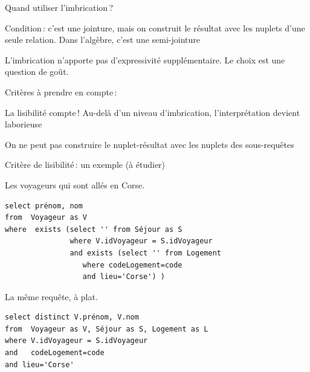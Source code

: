 \begin{frame}[fragile]{Quand utiliser l'imbrication\,?}

\alert{Condition}\,: c'est une jointure, mais on construit le résultat avec les nuplets d'une seule
relation. Dans l'algèbre, c'est une \alert{semi-jointure}

\vfill

L'imbrication n'apporte pas d'expressivité supplémentaire. Le choix est une question de goût.

\vfill

Critères à prendre en compte\,:

\vfill

\begin{redbullet}
  \item La lisibilité compte\,! Au-delà d'un niveau d'imbrication,
      l'interprétation devient laborieuse
  \item On ne peut pas construire le nuplet-résultat avec les nuplets des sous-requêtes
  
\end{redbullet}

\end{frame}


\begin{frame}[fragile]{Critère de lisibilité\,: un exemple (à étudier)}

Les voyageurs qui sont allés en Corse.

\vfill

\begin{verbatim}
select prénom, nom
from  Voyageur as V
where  exists (select '' from Séjour as S
               where V.idVoyageur = S.idVoyageur
               and exists (select '' from Logement
                  where codeLogement=code
                  and lieu='Corse') )
\end{verbatim}
\vfill
La même requête, à plat.

\begin{verbatim}
select distinct V.prénom, V.nom
from  Voyageur as V, Séjour as S, Logement as L
where V.idVoyageur = S.idVoyageur
and   codeLogement=code
and lieu='Corse'
\end{verbatim}

\end{frame}

